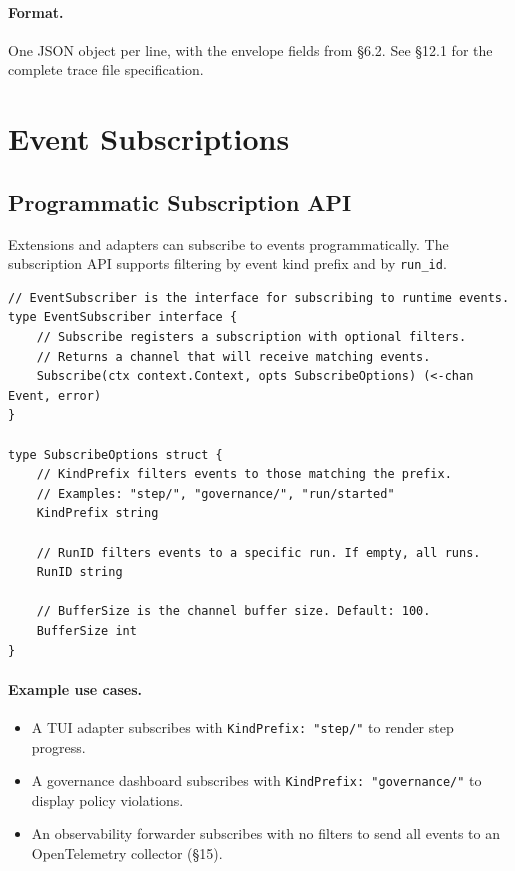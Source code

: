 \paragraph{Format.} One JSON object per line, with the envelope fields from §6.2. See §12.1 for the complete trace file specification.

\section{Event Subscriptions}

\subsection{Programmatic Subscription API}

Extensions and adapters can subscribe to events programmatically. The subscription API supports filtering by event kind prefix and by \texttt{run\_id}.

\begin{verbatim}
// EventSubscriber is the interface for subscribing to runtime events.
type EventSubscriber interface {
    // Subscribe registers a subscription with optional filters.
    // Returns a channel that will receive matching events.
    Subscribe(ctx context.Context, opts SubscribeOptions) (<-chan Event, error)
}

type SubscribeOptions struct {
    // KindPrefix filters events to those matching the prefix.
    // Examples: "step/", "governance/", "run/started"
    KindPrefix string

    // RunID filters events to a specific run. If empty, all runs.
    RunID string

    // BufferSize is the channel buffer size. Default: 100.
    BufferSize int
}
\end{verbatim}

\paragraph{Example use cases.}
\begin{itemize}
  \item A TUI adapter subscribes with \texttt{KindPrefix: "step/"} to render step progress.
  \item A governance dashboard subscribes with \texttt{KindPrefix: "governance/"} to display policy violations.
  \item An observability forwarder subscribes with no filters to send all events to an OpenTelemetry collector (§15).
\end{itemize}

